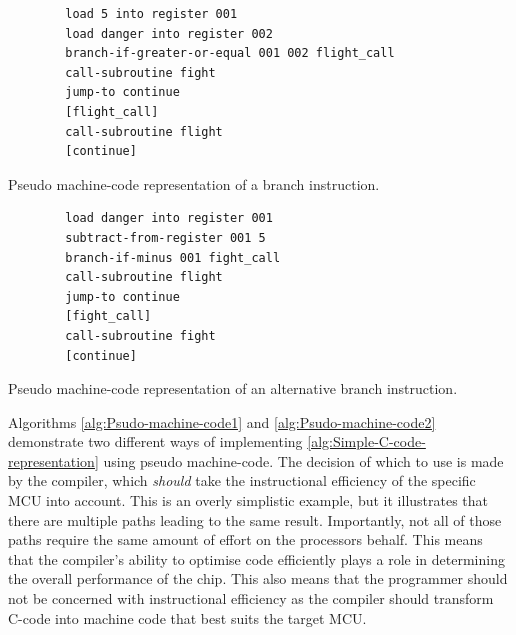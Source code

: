       \begin{algorithm}
        \begin{lstlisting}
        load 5 into register 001
        load danger into register 002
        branch-if-greater-or-equal 001 002 flight_call
        call-subroutine fight
        jump-to continue
        [flight_call]
        call-subroutine flight
        [continue]
        \end{lstlisting}
        \caption{\label{alg:Psudo-machine-code1}Pseudo machine-code representation
        of a branch instruction.}
      \end{algorithm}

      \begin{algorithm}
        \begin{lstlisting}
        load danger into register 001
        subtract-from-register 001 5
        branch-if-minus 001 fight_call
        call-subroutine flight
        jump-to continue
        [fight_call]
        call-subroutine fight
        [continue]
        \end{lstlisting}
        \caption{\label{alg:Psudo-machine-code2}Pseudo machine-code representation of an alternative branch instruction.}
      \end{algorithm}


      Algorithms \ref{alg:Psudo-machine-code1} and \ref{alg:Psudo-machine-code2} demonstrate two different ways of implementing \ref{alg:Simple-C-code-representation} using pseudo machine-code.
      The decision of which to use is made by the compiler, which \emph{should} take the instructional efficiency of the specific MCU into account.
      This is an overly simplistic example, but it illustrates that there are multiple paths leading to the same result.
      Importantly, not all of those paths require the same amount of effort on the processors behalf.
      This means that the compiler's ability to optimise code efficiently plays a role in determining the overall performance of the chip.
      This also means that the programmer should not be concerned with instructional efficiency as the compiler should transform C-code into machine code that best suits the target MCU.

